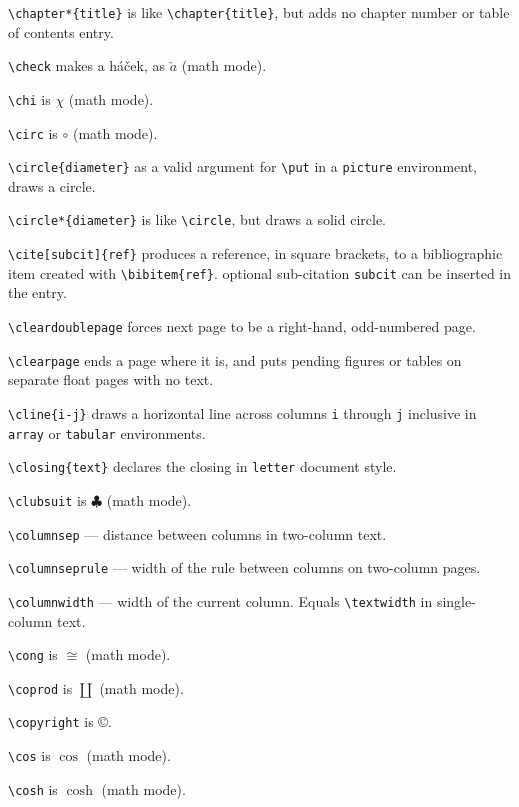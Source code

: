 \verb"\chapter*{title}" is like \verb"\chapter{title}", but adds no
	chapter number or table of contents entry.

\verb"\check" makes a h\'a\v cek, as $\check a$ (math mode).

\verb"\chi" is $\chi$ (math mode).

\verb"\circ" is $\circ$ (math mode).

\verb"\circle{diameter}" as a valid argument for \verb"\put" in a
	\verb"picture" environment, draws a circle.

\verb"\circle*{diameter}" is like \verb"\circle", but draws a solid circle.

\verb"\cite[subcit]{ref}" produces a reference, in square brackets, to a
	bibliographic item created with \verb"\bibitem{ref}".
	optional sub-citation \verb"subcit" can be inserted in the entry.

\verb"\cleardoublepage" forces next page to be a right-hand, odd-numbered page.

\verb"\clearpage" ends a page where it is, and puts pending figures or tables
	on separate float pages with no text.

\verb"\cline{i-j}" draws a horizontal line across columns \verb"i" through
	\verb"j" inclusive in \verb"array" or \verb"tabular" environments.

\verb"\closing{text}" declares the closing in \verb"letter" document style.

\verb"\clubsuit" is $\clubsuit$ (math mode).

\verb"\columnsep" --- distance between columns in two-column text.

\verb"\columnseprule" --- width of the rule between columns on two-column
	pages.

\verb"\columnwidth" --- width of the current column.  Equals \verb"\textwidth"
	in single-column text.

\verb"\cong" is $\cong$ (math mode).

\verb"\coprod" is $\coprod$ (math mode).

\verb"\copyright" is \copyright.

\verb"\cos" is $\cos$ (math mode).

\verb"\cosh" is $\cosh$ (math mode).

